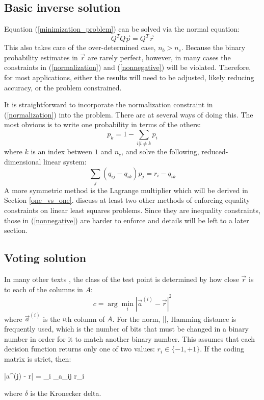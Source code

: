 \subsection{Basic inverse solution}

Equation (\ref{minimization_problem}) can be solved via the normal
equation:
\begin{equation}
	Q^T Q \vec p = Q^T \vec r
	\label{normal_equation}
\end{equation}
This also takes care of the over-determined case, $n_b > n_c$.
Because the binary probability estimates in $\vec r$ are rarely perfect, however,
in many cases the constraints in (\ref{normalization}) and (\ref{nonnegative}) will be violated. 
Therefore, for most applications, either the results will need to be adjusted, likely reducing accuracy, or the problem constrained.

It is straightforward to incorporate the normalization constraint in (\ref{normalization}) into the problem. 
There are at several ways of doing this. The most
obvious is to write one probability in terms of the others:
\begin{equation}
	p_k = 1 - \sum_{i|i \ne k} p_i
	\label{reduce_dimension1}
\end{equation}
where $k$ is an index between $1$ and $n_c$,
and solve the following, reduced-dimensional linear system:
\begin{equation}
	\sum_j (q_{ij} - q_{ik} ) p_j = r_i - q_{ik}
	\label{reduce_dimension2}
\end{equation}
A more symmetric method is the Lagrange multiplier which will be
derived in Section \ref{one_vs_one}.
\citet{Lawson_Hanson1995} discuss at least two other methods of
enforcing equality constraints on linear least squares problems.
Since they are inequality constraints, those in (\ref{nonnegative}) are
harder to enforce and details  will be left to a later section.

\subsection{Voting solution}

In many other texts \citep{Allwein_etal2000,Hsu_Lin2002,Dietterich_Bakiri1995},
the class of the test point is determined by how close $\vec r$
is to each of the columns in $A$:
\begin{equation}
	c = \arg \min_i |\vec a^{(i)} - \vec r|^2
	\label{distance_based_decoding}
\end{equation}
where $\vec a^{(i)}$ is the $i$th column of $A$.
For the norm, $||$, Hamming distance is
frequently used, which is the number of bits that must be changed
in a binary number in order for it to match another binary number.
This assumes that each decision function returns only one of two values: 
$r_i \in \lbrace -1, +1 \rbrace$.
If the coding matrix is strict, then:
\begin{eqnnon}
	|\vec a^{(j)} - \vec r| = \sum_i \delta_{a_{ij} r_i}
\end{eqnnon}
where $\delta$ is the Kronecker delta.

